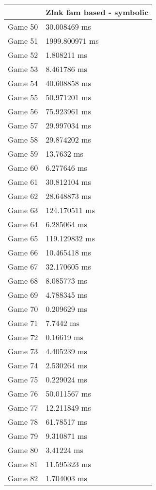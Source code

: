 \begin{multicols}{2}
\begin{tabular}{|l|l|}
\end{tabular}\\
\begin{tabular}{|l|l|}
	\hline
	& Zlnk fam based - symbolic \\ \hline
	Game 50 & 30.008469 ms \\ \hline
	Game 51 & 1999.800971 ms \\ \hline
	Game 52 & 1.808211 ms \\ \hline
	Game 53 & 8.461786 ms \\ \hline
	Game 54 & 40.608858 ms \\ \hline
	Game 55 & 50.971201 ms \\ \hline
	Game 56 & 75.923961 ms \\ \hline
	Game 57 & 29.997034 ms \\ \hline
	Game 58 & 29.874202 ms \\ \hline
	Game 59 & 13.7632 ms \\ \hline
	Game 60 & 6.277646 ms \\ \hline
	Game 61 & 30.812104 ms \\ \hline
	Game 62 & 28.648873 ms \\ \hline
	Game 63 & 124.170511 ms \\ \hline
	Game 64 & 6.285064 ms \\ \hline
	Game 65 & 119.129832 ms \\ \hline
	Game 66 & 10.465418 ms \\ \hline
	Game 67 & 32.170605 ms \\ \hline
	Game 68 & 8.085773 ms \\ \hline
	Game 69 & 4.788345 ms \\ \hline
	Game 70 & 0.209629 ms \\ \hline
	Game 71 & 7.7442 ms \\ \hline
	Game 72 & 0.16619 ms \\ \hline
	Game 73 & 4.405239 ms \\ \hline
	Game 74 & 2.530264 ms \\ \hline
	Game 75 & 0.229024 ms \\ \hline
	Game 76 & 50.011567 ms \\ \hline
	Game 77 & 12.211849 ms \\ \hline
	Game 78 & 61.78517 ms \\ \hline
	Game 79 & 9.310871 ms \\ \hline
	Game 80 & 3.41224 ms \\ \hline
	Game 81 & 11.595323 ms \\ \hline
	Game 82 & 1.704003 ms \\ \hline

\end{tabular}
\end{multicols}

